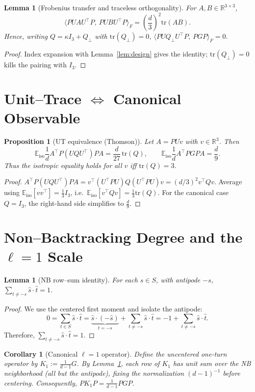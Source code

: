 \documentclass[11pt]{article}
\newtheorem{lemma}[theorem]{Lemma}
\newtheorem{proposition}[theorem]{Proposition}
\newtheorem{corollary}[theorem]{Corollary}
\theoremstyle{definition}
\newcommand{\E}{\mathbb{E}}
\newcommand{\R}{\mathbb{R}}
\newcommand{\1}{\mathbf{1}}
\newcommand{\tr}{\mathrm{tr}}
\begin{document}
\begin{lemma}[Frobenius transfer and traceless orthogonality]
\label{lem:transfer}
For \(A,B\in\R^{3\times 3}\),
\[
\langle PUAU^\top P,\ PUBU^\top P\rangle_F=\left(\frac{d}{3}\right)^{\!2}\tr(AB).
\]
Hence, writing \(Q=\kappa I_3+Q_\perp\) with \(\tr(Q_\perp)=0\),
\(
\langle PUQ_\perp U^\top P,\ PGP\rangle_F=0.
\)
\end{lemma}
\begin{proof}
Index expansion with Lemma~\ref{lem:design} gives the identity; \(\tr(Q_\perp)=0\) kills the pairing with \(I_3\).
\end{proof}

\section{Unit–Trace $\Leftrightarrow$ Canonical Observable}
\begin{proposition}[UT equivalence (Thomson)]
\label{prop:UT}
Let \(A=PUv\) with \(v\in\R^3\). Then
\[
\E_{\mathrm{iso}}\frac{1}{d}A^\top P(UQU^\top)P A
=\frac{d}{27}\,\tr(Q),\qquad
\E_{\mathrm{iso}}\frac{1}{d}A^\top PGP A=\frac{d}{9}.
\]
Thus the isotropic equality holds for all \(v\) iff \(\tr(Q)=3\).
\end{proposition}
\begin{proof}
\(A^\top P(UQU^\top)P A=v^\top (U^\top P U)Q(U^\top P U)v=(d/3)^2 v^\top Q v\).
Average using \(\E_{\mathrm{iso}}[vv^\top]=\tfrac{1}{3}I_3\), i.e.\ \(\E_{\mathrm{iso}}[v^\top Q v]=\tfrac{1}{3}\tr(Q)\).
For the canonical case \(Q=I_3\), the right-hand side simplifies to \(\frac{d}{9}\).
\end{proof}

\section{Non–Backtracking Degree and the $\ell=1$ Scale}
\begin{lemma}[NB row–sum identity]
\label{lem:NB}
For each \(s\in S\), with antipode \(-s\),
\(
\sum_{t\neq -s} \hat s\cdot \hat t = 1
\).
\end{lemma}
\begin{proof}
We use the centered first moment and isolate the antipode:
\[
0=\sum_{t\in S}\hat s\cdot\hat t
=\underbrace{\hat s\cdot(-\hat s)}_{t=-s}+\sum_{t\neq -s}\hat s\cdot\hat t
=-1+\sum_{t\neq -s}\hat s\cdot\hat t.
\]
Therefore, \(\sum_{t\neq -s}\hat s\cdot\hat t=1\).
\end{proof}

\begin{corollary}[Canonical $\ell=1$ operator]
\label{cor:K1}
Define the uncentered one-turn operator by
\(
K_1:=\frac{1}{d-1}G
\).
By Lemma~\ref{lem:NB}, each row of \(K_1\) has unit sum over the NB neighborhood (all but the antipode), fixing the normalization \((d-1)^{-1}\) \emph{before} centering. Consequently,
\(
PK_1P=\frac{1}{d-1}PGP
\).
\end{corollary}
\end{document}
